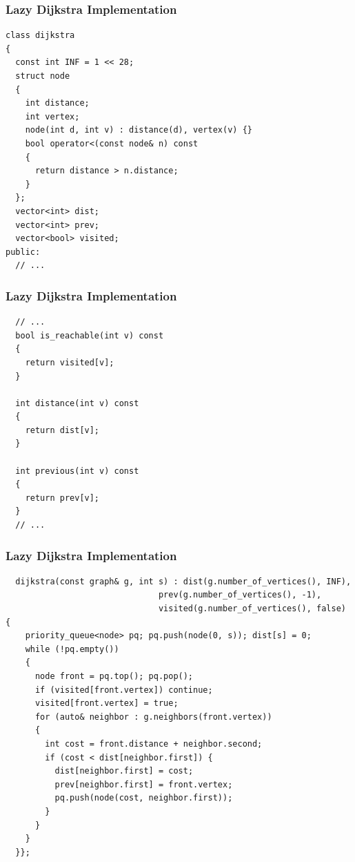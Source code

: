 \documentclass{beamer}
\newcommand{\uvalink}[2]{UVa Online Judge (http://uva.onlinejudge.org)
  problem number \href{#2}{\textcolor{blue}{#1}.}}
\newcounter{exo}
\newcommand{\exo}{
  \addtocounter{exo}{1}
  Exercice \arabic{exo}
}
\begin{document}
\begin{frame}[containsverbatim]
\frametitle{Lazy Dijkstra Implementation}
\scriptsize
\begin{lstlisting}
class dijkstra
{
  const int INF = 1 << 28;
  struct node
  {
    int distance;
    int vertex;
    node(int d, int v) : distance(d), vertex(v) {}
    bool operator<(const node& n) const
    {
      return distance > n.distance;
    }
  };
  vector<int> dist;
  vector<int> prev;
  vector<bool> visited;
public:
  // ...
\end{lstlisting}

\end{frame}

\begin{frame}[containsverbatim]
\frametitle{Lazy Dijkstra Implementation}
\scriptsize
\begin{lstlisting}
  // ...
  bool is_reachable(int v) const
  {
    return visited[v];
  }

  int distance(int v) const
  {
    return dist[v];
  }

  int previous(int v) const
  {
    return prev[v];
  }
  // ...
\end{lstlisting}

\end{frame}

\begin{frame}[containsverbatim]
\frametitle{Lazy Dijkstra Implementation}
\scriptsize
\begin{lstlisting}
  dijkstra(const graph& g, int s) : dist(g.number_of_vertices(), INF),
                               prev(g.number_of_vertices(), -1),
                               visited(g.number_of_vertices(), false) {
    priority_queue<node> pq; pq.push(node(0, s)); dist[s] = 0;
    while (!pq.empty())
    {
      node front = pq.top(); pq.pop();
      if (visited[front.vertex]) continue;
      visited[front.vertex] = true;
      for (auto& neighbor : g.neighbors(front.vertex))
      {
        int cost = front.distance + neighbor.second;
        if (cost < dist[neighbor.first]) {
          dist[neighbor.first] = cost;
          prev[neighbor.first] = front.vertex;
          pq.push(node(cost, neighbor.first));
        }
      }
    }
  }};
\end{lstlisting}

\end{frame}

\end{document}
